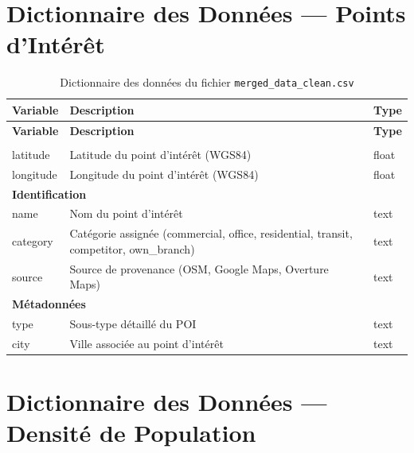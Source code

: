 \documentclass[11pt,a4paper,twoside]{report}
\begin{document}
\section{Dictionnaire des Données --- Points d'Intérêt}

\begin{center}
\small
\renewcommand{\arraystretch}{1.15}
\begin{longtable}{|p{4.2cm}|p{6.5cm}|p{2.3cm}|}
\caption{Dictionnaire des données du fichier \texttt{merged\_data\_clean.csv}} \label{tab:dict_poi} \\
\hline
\textbf{Variable} & \textbf{Description} & \textbf{Type} \\
\hline
\endfirsthead
\hline
\textbf{Variable} & \textbf{Description} & \textbf{Type} \\
\hline
\endhead
\hline
\endfoot
\hline
\endlastfoot

\multicolumn{3}{|l|}{\textbf{Localisation}} \\
\hline
latitude & Latitude du point d'intérêt (WGS84) & float \\
\hline
longitude & Longitude du point d'intérêt (WGS84) & float \\
\hline

\multicolumn{3}{|l|}{\textbf{Identification}} \\
\hline
name & Nom du point d'intérêt & text \\
\hline
category & Catégorie assignée (commercial, office, residential, transit, competitor, own\_branch) & text \\
\hline
source & Source de provenance (OSM, Google Maps, Overture Maps) & text \\
\hline

\multicolumn{3}{|l|}{\textbf{Métadonnées}} \\
\hline
type & Sous-type détaillé du POI & text \\
\hline
city & Ville associée au point d'intérêt & text \\
\hline

\end{longtable}
\end{center}

\section{Dictionnaire des Données --- Densité de Population}
\end{document}
